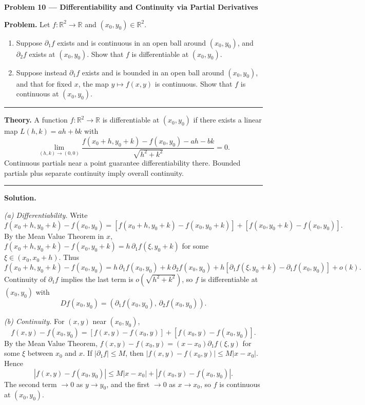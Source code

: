 \documentclass[12pt,a4paper]{article}
\theoremstyle{plain}
\theoremstyle{definition}
\theoremstyle{remark}
\theoremstyle{remark}
\newcommand{\probheader}[1]{%
	\par\vspace{8pt}%
	{\Large\bfseries #1\par}%
	\vspace{6pt}%
}
\newcommand{\sep}{\vspace{6pt}\hrule\vspace{8pt}}
\begin{document}
	
	\probheader{Problem 10 — Differentiability and Continuity via Partial Derivatives}
	
	\textbf{Problem.}
	Let $f:\mathbb{R}^2\to\mathbb{R}$ and $(x_0,y_0)\in\mathbb{R}^2$.
	\begin{enumerate}[label=(\alph*), leftmargin=1.2cm]
		\item Suppose $\partial_1 f$ exists and is continuous in an open ball around $(x_0,y_0)$,
		and $\partial_2 f$ exists at $(x_0,y_0)$. Show that $f$ is differentiable at $(x_0,y_0)$.
		\item Suppose instead $\partial_1 f$ exists and is bounded in an open ball around $(x_0,y_0)$,
		and that for fixed $x$, the map $y\mapsto f(x,y)$ is continuous.
		Show that $f$ is continuous at $(x_0,y_0)$.
	\end{enumerate}
	
	\sep
	
	\textbf{Theory.}
	A function $f:\mathbb{R}^2\to\mathbb{R}$ is differentiable at $(x_0,y_0)$ if
	there exists a linear map $L(h,k)=a h+b k$ with
	\[
	\lim_{(h,k)\to(0,0)}
	\frac{f(x_0+h,y_0+k)-f(x_0,y_0)-a h-b k}{\sqrt{h^2+k^2}}=0.
	\]
	Continuous partials near a point guarantee differentiability there.
	Bounded partials plus separate continuity imply overall continuity.
	
	\sep
	
	\textbf{Solution.}
	
	\textit{(a) Differentiability.}
	Write
	\[
	f(x_0+h,y_0+k)-f(x_0,y_0)
	=[f(x_0+h,y_0+k)-f(x_0,y_0+k)]
	+[f(x_0,y_0+k)-f(x_0,y_0)].
	\]
	By the Mean Value Theorem in $x$,
	$f(x_0+h,y_0+k)-f(x_0,y_0+k)=h\,\partial_1 f(\xi,y_0+k)$
	for some $\xi\in(x_0,x_0+h)$.
	Thus
	\[
	f(x_0+h,y_0+k)-f(x_0,y_0)
	=h\,\partial_1 f(x_0,y_0)
	+k\,\partial_2 f(x_0,y_0)
	+h[\partial_1 f(\xi,y_0+k)-\partial_1 f(x_0,y_0)] + o(k).
	\]
	Continuity of $\partial_1 f$ implies the last term is $o(\sqrt{h^2+k^2})$,
	so $f$ is differentiable at $(x_0,y_0)$ with
	\[
	Df(x_0,y_0)=(\partial_1 f(x_0,y_0),\,\partial_2 f(x_0,y_0)).
	\]
	
	\medskip
	
	\textit{(b) Continuity.}
	For $(x,y)$ near $(x_0,y_0)$,
	\[
	f(x,y)-f(x_0,y_0)
	=[f(x,y)-f(x_0,y)] + [f(x_0,y)-f(x_0,y_0)].
	\]
	By the Mean Value Theorem,
	$f(x,y)-f(x_0,y)=(x-x_0)\partial_1 f(\xi,y)$ for some $\xi$ between $x_0$ and $x$.
	If $|\partial_1 f|\le M$, then $|f(x,y)-f(x_0,y)|\le M|x-x_0|$.
	Hence
	\[
	|f(x,y)-f(x_0,y_0)|
	\le M|x-x_0| + |f(x_0,y)-f(x_0,y_0)|.
	\]
	The second term $\to0$ as $y\to y_0$, and the first $\to0$ as $x\to x_0$,
	so $f$ is continuous at $(x_0,y_0)$.
	
\end{document}
